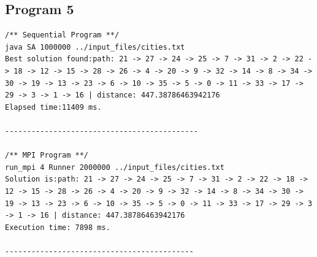 \documentclass{article}
\begin{document}
		\subsection{Program 5} \label{P5_OUT}		
			\begin{lstlisting}
/** Sequential Program **/
java SA 1000000 ../input_files/cities.txt
Best solution found:path: 21 -> 27 -> 24 -> 25 -> 7 -> 31 -> 2 -> 22 -> 18 -> 12 -> 15 -> 28 -> 26 -> 4 -> 20 -> 9 -> 32 -> 14 -> 8 -> 34 -> 30 -> 19 -> 13 -> 23 -> 6 -> 10 -> 35 -> 5 -> 0 -> 11 -> 33 -> 17 -> 29 -> 3 -> 1 -> 16 | distance: 447.38786463942176
Elapsed time:11409 ms.

--------------------------------------------

/** MPI Program **/
run_mpi 4 Runner 2000000 ../input_files/cities.txt
Solution is:path: 21 -> 27 -> 24 -> 25 -> 7 -> 31 -> 2 -> 22 -> 18 -> 12 -> 15 -> 28 -> 26 -> 4 -> 20 -> 9 -> 32 -> 14 -> 8 -> 34 -> 30 -> 19 -> 13 -> 23 -> 6 -> 10 -> 35 -> 5 -> 0 -> 11 -> 33 -> 17 -> 29 -> 3 -> 1 -> 16 | distance: 447.38786463942176
Execution time: 7898 ms.

-------------------------------------------


\end{lstlisting}
\end{document}
